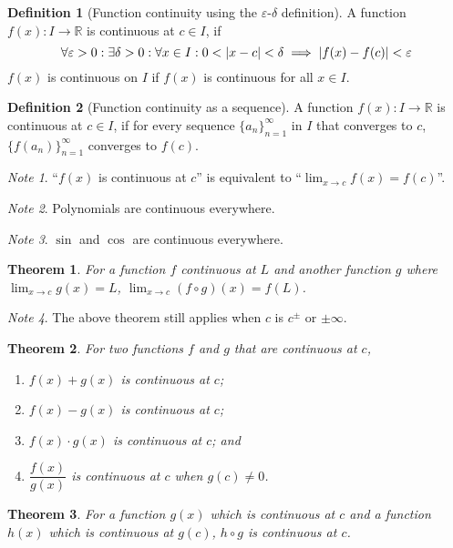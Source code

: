 \documentclass{article}
\newcommand*{\R}{\mathbb{R}}
\theoremstyle{plain}
\newtheorem{theorem}{Theorem}[section]
\numberwithin{theorem}{subsection}
\theoremstyle{definition}
\newtheorem{definition}{Definition}[section]
\numberwithin{definition}{subsection}
\theoremstyle{remark}
\newtheorem{note}{Note}[section]
\numberwithin{note}{subsection}
\begin{document}
%
\begin{definition}[Function continuity using the $\varepsilon$-$\delta$ definition]
    A function $f(x):I\to\R$ is continuous at $c \in I$, if
	\begin{equation*}
		\forall\varepsilon>0: \exists\delta>0: \forall x\in I:0<\abs{x-c}<\delta \implies \abs{f(x)-f(c)}<\varepsilon
	\end{equation*}
    $f(x)$ is continuous on $I$ if $f(x)$ is continuous for all $x \in I$.
\end{definition}
%
\begin{definition}[Function continuity as a sequence]
    A function $f(x):I\to\R$ is continuous at $c \in I$, if
    for every sequence $\{a_n\}^{\infty}_{n=1}$ in $I$ that converges to $c$,
    $\{f(a_n)\}^{\infty}_{n=1}$ converges to $f(c)$.
\end{definition}
%
\begin{note}
    ``$f(x)$ is continuous at $c$'' is equivalent to
    ``$\displaystyle \lim_{x\to c} f(x) = f(c)$''.
\end{note}
%
\begin{note}
    Polynomials are continuous everywhere.
\end{note}
%
\begin{note}
    $\sin$ and $\cos$ are continuous everywhere.
\end{note}
%
\begin{theorem}
    For a function $f$ continuous at $L$
    and another function $g$ where $\displaystyle \lim_{x\to c}g(x) = L$,
    $\displaystyle \lim_{x\to c} (f \circ g)(x) = f(L)$.
\end{theorem}
\begin{note}
    The above theorem still applies when $c$ is $c^\pm$ or $\pm\infty$.
\end{note}
%
\begin{theorem}
    For two functions $f$ and $g$ that are continuous at $c$,
    \begin{enumerate}[label=\normalfont\alph*)]
        \item $f(x) + g(x)$ is continuous at $c$;
        \item $f(x) - g(x)$ is continuous at $c$;
        \item $f(x) \cdot g(x)$ is continuous at $c$; and
        \item $\dfrac{f(x)}{g(x)}$ is continuous at $c$ when $g(c)\ne0$.
    \end{enumerate}
\end{theorem}
%
\begin{theorem}
    For a function $g(x)$ which is continuous at $c$ and
    a function $h(x)$ which is continuous at $g(c)$,
    $h \circ g$ is continuous at $c$.
\end{theorem}
\end{document}
